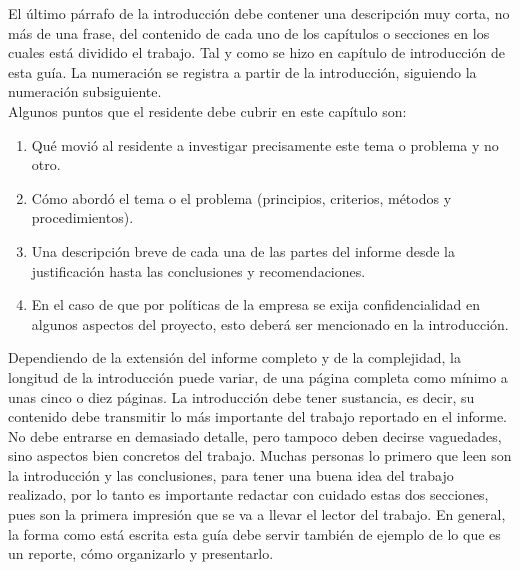 	
	El \'ultimo p\'arrafo de la introducci\'on debe contener una descripci\'on muy corta, no m\'as de una frase, del contenido
	de cada uno de los cap\'itulos o secciones en los cuales est\'a dividido el trabajo. Tal y como se
	hizo en cap\'itulo de introducci\'on de esta gu\'ia. La numeraci\'on se registra a partir de la introducci\'on, 
	siguiendo la numeraci\'on subsiguiente.\\
	
	Algunos puntos que el residente debe cubrir en este cap\'itulo son:
\begin{enumerate}
	\item Qu\'e movi\'o al residente a investigar precisamente este tema o problema y no otro. 

	\item C\'omo abord\'o el tema o el problema (principios, criterios, m\'etodos y procedimientos).
	
  \item Una descripci\'on breve de cada una de las partes del informe desde la justificaci\'on hasta las conclusiones y 
				recomendaciones. 	
	
	\item En el caso de que por pol\'iticas de la empresa se exija confidencialidad en algunos aspectos del proyecto, esto 
				deber\'a ser mencionado en la introducci\'on.
\end{enumerate}
 
	Dependiendo de la extensi\'on del informe completo y de la complejidad, la longitud de
	la introducci\'on puede variar, de una p\'agina completa como m\'inimo a unas cinco o diez
	p\'aginas. La introducci\'on debe tener sustancia, es decir, su contenido debe transmitir lo
	m\'as importante del trabajo reportado en el informe. No debe entrarse en demasiado detalle,
	pero tampoco deben decirse vaguedades, sino aspectos bien concretos del trabajo. Muchas
	personas lo primero que leen son la introducci\'on y las conclusiones, para tener una buena
	idea del trabajo realizado, por lo tanto es importante redactar con cuidado
	estas dos secciones, pues son la primera impresi\'on que se va a llevar el lector del trabajo.
	En general, la forma como est\'a escrita esta gu\'ia debe servir tambi\'en de ejemplo de lo
	que es un reporte, c\'omo organizarlo y presentarlo.
	

	